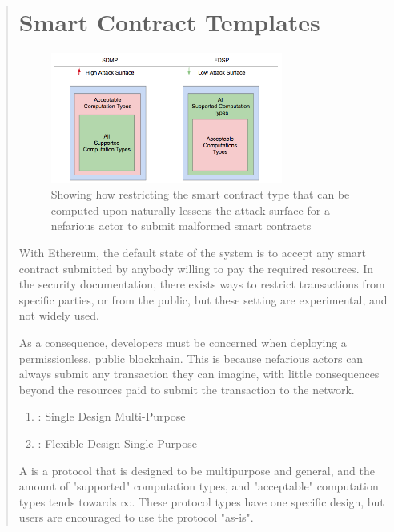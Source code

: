 \documentclass[12pt, titlepage, twocolumn]{report}
\begin{document}
\begin{quotation}
\section{Smart Contract Templates}

 \begin{figure}[ht]
\centering
	\includegraphics[width=0.75\textwidth]{contract_security}
	\caption{Showing how restricting the smart contract type that can be computed upon naturally lessens the attack surface for a nefarious actor to submit malformed smart contracts}
	\label{contract_security}
\end{figure}


With Ethereum, the default state of the system is to accept any smart contract submitted by anybody willing to pay the required resources. In the security documentation, there exists ways to restrict transactions from specific parties, or from the public, but these setting are experimental, and not widely used. 

As a consequence, developers must be concerned when deploying a permissionless, public blockchain. This is because nefarious actors can always submit any transaction they can imagine, with little consequences beyond the resources paid to submit the transaction to the network.

\begin{enumerate}
	\item \texttt{}: Single Design Multi-Purpose 
	\item \texttt{}: Flexible Design Single Purpose
\end{enumerate}

A \texttt{} is a protocol that is designed to be multipurpose and general, and the amount of "supported" computation types, and "acceptable" computation types tends towards \(\infty\). These protocol types have one specific design, but users are encouraged to use the protocol "as-is". 


\end{quotation}
\end{document}
